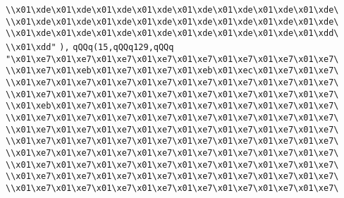 \verb|\\x01\xde\x01\xde\x01\xde\x01\xde\x01\xde\x01\xde\x01\xde\x01\xde\|\newline
\verb|\\x01\xde\x01\xde\x01\xde\x01\xde\x01\xde\x01\xde\x01\xde\x01\xde\|\newline
\verb|\\x01\xde\x01\xde\x01\xde\x01\xde\x01\xde\x01\xde\x01\xde\x01\xdd\|\newline
\verb|\\x01\xdd"|\newline
\verb|),|\newline
\verb|qQQq(15,qQQq129,qQQq|\newline
\verb|"\x01\xe7\x01\xe7\x01\xe7\x01\xe7\x01\xe7\x01\xe7\x01\xe7\x01\xe7\|\newline
\verb|\\x01\xe7\x01\xeb\x01\xe7\x01\xe7\x01\xeb\x01\xec\x01\xe7\x01\xe7\|\newline
\verb|\\x01\xe7\x01\xe7\x01\xe7\x01\xe7\x01\xe7\x01\xe7\x01\xe7\x01\xe7\|\newline
\verb|\\x01\xe7\x01\xe7\x01\xe7\x01\xe7\x01\xe7\x01\xe7\x01\xe7\x01\xe7\|\newline
\verb|\\x01\xeb\x01\xe7\x01\xe7\x01\xe7\x01\xe7\x01\xe7\x01\xe7\x01\xe7\|\newline
\verb|\\x01\xe7\x01\xe7\x01\xe7\x01\xe7\x01\xe7\x01\xe7\x01\xe7\x01\xe7\|\newline
\verb|\\x01\xe7\x01\xe7\x01\xe7\x01\xe7\x01\xe7\x01\xe7\x01\xe7\x01\xe7\|\newline
\verb|\\x01\xe7\x01\xe7\x01\xe7\x01\xe7\x01\xe7\x01\xe7\x01\xe7\x01\xe7\|\newline
\verb|\\x01\xe7\x01\xe7\x01\xe7\x01\xe7\x01\xe7\x01\xe7\x01\xe7\x01\xe7\|\newline
\verb|\\x01\xe7\x01\xe7\x01\xe7\x01\xe7\x01\xe7\x01\xe7\x01\xe7\x01\xe7\|\newline
\verb|\\x01\xe7\x01\xe7\x01\xe7\x01\xe7\x01\xe7\x01\xe7\x01\xe7\x01\xe7\|\newline
\verb|\\x01\xe7\x01\xe7\x01\xe7\x01\xe7\x01\xe7\x01\xe7\x01\xe7\x01\xe7\|\newline
